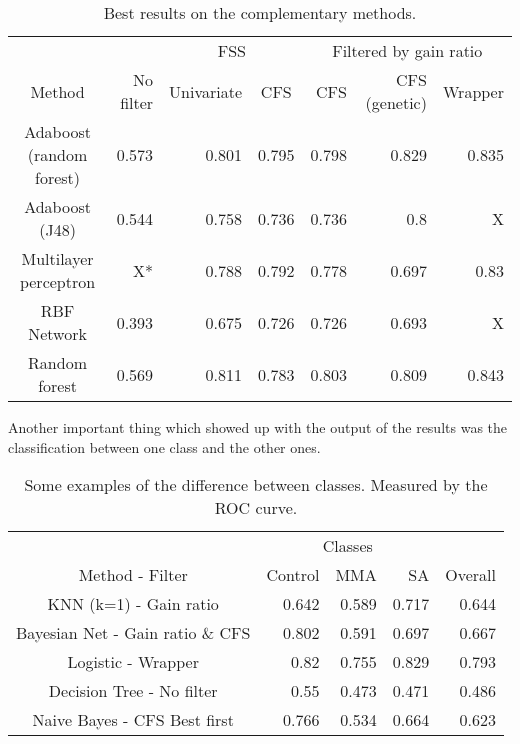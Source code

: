 \documentclass[conference,a4paper]{IEEEtran}
\begin{document}
\begin{table}[h]
	\caption{Best results on the complementary methods.}
	\centering
	\begin{tabular}{c r r r r r r}
		\hline\hline
		& & \multicolumn{2}{c|}{FSS} & \multicolumn{3}{c}{Filtered by gain ratio}\\
		Method & No filter & Univariate & \multicolumn{1}{c|}{CFS} & CFS & CFS (genetic) & Wrapper\\ [0.2ex]
		\hline
		Adaboost (random forest) & 0.573 & 0.801 & 0.795 & 0.798 & 0.829 & 0.835 \\
		Adaboost (J48) & 0.544 & 0.758 & 0.736 & 0.736 & 0.8 & X \\
		Multilayer perceptron & X* & 0.788 & 0.792 & 0.778 & 0.697 & 0.83 \\
		RBF Network & 0.393 & 0.675 & 0.726 & 0.726 & 0.693 & X\\
		Random forest & 0.569 & 0.811 & 0.783 & 0.803 & 0.809 & 0.843 \\ [1ex]
		\hline
	\end{tabular}
	\label{table:complementaryResults}
\end{table}


Another important thing which showed up with the output of the results was the classification between one class and the other ones.

\begin{table}[h]
	\caption{Some examples of the difference between classes. Measured by the ROC curve.}
	\centering
	\begin{tabular}{c r r r r}
		\hline\hline
		& \multicolumn{3}{c|}{Classes} & \\
		Method - Filter & Control & MMA & SA & \multicolumn{1}{|c}{Overall}\\ [0.2ex]
		\hline 
		KNN (k=1) - Gain ratio & 0.642 & 0.589 & 0.717 & 0.644 \\
		Bayesian Net - Gain ratio \& CFS & 0.802 & 0.591 & 0.697 & 0.667 \\
		Logistic - Wrapper & 0.82 & 0.755 & 0.829 & 0.793 \\
		Decision Tree - No filter & 0.55 & 0.473 & 0.471 & 0.486\\
		Naive Bayes - CFS Best first & 0.766 & 0.534 & 0.664 & 0.623 \\ [1ex]
		\hline
	\end{tabular}
	\label{table:inClassResults}
\end{table}
\end{document}
